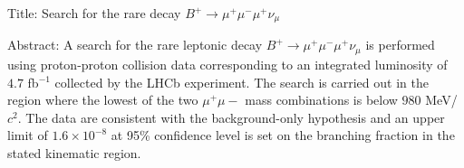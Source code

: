 Title: Search for the rare decay $B^{+} \rightarrow \mu^{+}\mu^{-}\mu^{+}\nu_{\mu}$

Abstract: A search for the rare leptonic decay $B^{+} \rightarrow \mu^{+}\mu^{-}\mu^{+}\nu_{\mu}$ is performed using proton-proton collision data corresponding to an integrated luminosity of $4.7$ fb$^{-1}$ collected by the LHCb experiment. The search is carried out in the region where the lowest of the two $\mu^{+}\mu{-}$ mass combinations is below $980$ MeV/$c^{2}$. The data are consistent with the background-only hypothesis and an upper limit of $1.6 \times 10^{-8}$ at 95\% confidence level is set on the branching fraction in the stated kinematic region.
